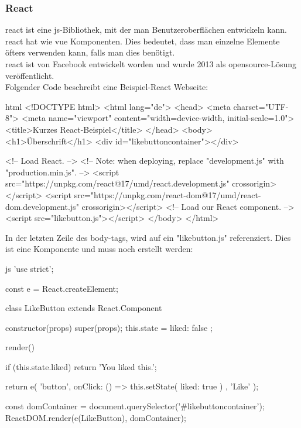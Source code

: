 \subsubsection{React}
\Gls{react} ist eine \Gls{js}-Bibliothek, mit der man Benutzeroberflächen entwickeln kann\cite{reactdoc}. \Gls{react} hat wie \Gls{vue} Komponenten. Dies bedeutet, dass man einzelne Elemente öfters verwenden kann, falls man dies benötigt.\\
\Gls{react} ist von Facebook entwickelt worden und wurde 2013 als \Gls{opensource}-Lösung veröffentlicht.\\
Folgender Code beschreibt eine Beispiel-React Webseite\cite{reactdoc}:
\begin{code}{html}
	<!DOCTYPE html>
	<html lang="de">
		<head>
			<meta charset="UTF-8">
			<meta name="viewport" content="width=device-width, initial-scale=1.0">
			<title>Kurzes React-Beispiel</title>
		</head>
		<body>
			<h1>Überschrift</h1>
			<div id="likebuttoncontainer"></div>
			
			<!-- Load React. -->
			<!-- Note: when deploying, replace "development.js" with "production.min.js". -->
			<script src="https://unpkg.com/react@17/umd/react.development.js" crossorigin></script>  <script src="https://unpkg.com/react-dom@17/umd/react-dom.development.js" crossorigin></script>
			<!-- Load our React component. -->
			<script src="likebutton.js"></script>
		</body>
	</html>
\end{code}
In der letzten Zeile des body-tags, wird auf ein "likebutton.js" referenziert. Dies ist eine Komponente und muss noch erstellt werden\cite{reactdoc}:
\begin{code}{js}
	'use strict';
	
	const e = React.createElement;
	
	class LikeButton extends React.Component {
		constructor(props) {
			super(props);
			this.state = { liked: false };
		}
		
		render() {
			if (this.state.liked) {
				return 'You liked this.';
			}
			
			return e(
			'button',
			{ onClick: () => this.setState({ liked: true }) },
			'Like'
			);
		}
	}
	
	const domContainer = document.querySelector('#likebuttoncontainer');
	ReactDOM.render(e(LikeButton), domContainer);
\end{code}

